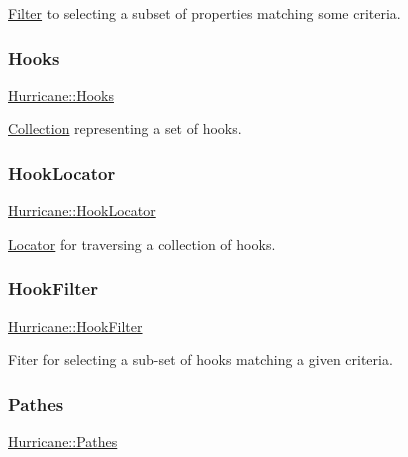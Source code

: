 \mbox{\hyperlink{classHurricane_1_1Filter}{Filter}} to selecting a subset of properties matching some criteria. \mbox{\label{namespaceHurricane_a9dcd9b74dc5e2b51bec7a13c25807e02}} 
\subsubsection{\texorpdfstring{Hooks}{Hooks}}
{\footnotesize\ttfamily \mbox{\hyperlink{namespaceHurricane_a9dcd9b74dc5e2b51bec7a13c25807e02}{Hurricane\+::\+Hooks}}}

\mbox{\hyperlink{classHurricane_1_1Collection}{Collection}} representing a set of hooks. \mbox{\label{namespaceHurricane_aca3a5babe6265eb9f140112d8e8b79e6}} 
\subsubsection{\texorpdfstring{Hook\+Locator}{HookLocator}}
{\footnotesize\ttfamily \mbox{\hyperlink{namespaceHurricane_aca3a5babe6265eb9f140112d8e8b79e6}{Hurricane\+::\+Hook\+Locator}}}

\mbox{\hyperlink{classHurricane_1_1Locator}{Locator}} for traversing a collection of hooks. \mbox{\label{namespaceHurricane_a9287de05984b91e55592a77e8d394324}} 
\subsubsection{\texorpdfstring{Hook\+Filter}{HookFilter}}
{\footnotesize\ttfamily \mbox{\hyperlink{namespaceHurricane_a9287de05984b91e55592a77e8d394324}{Hurricane\+::\+Hook\+Filter}}}

Fiter for selecting a sub-\/set of hooks matching a given criteria. \mbox{\label{namespaceHurricane_a77e8a0f11b7d0d65a47a592f7bdfd061}} 
\subsubsection{\texorpdfstring{Pathes}{Pathes}}
{\footnotesize\ttfamily \mbox{\hyperlink{namespaceHurricane_a77e8a0f11b7d0d65a47a592f7bdfd061}{Hurricane\+::\+Pathes}}}

